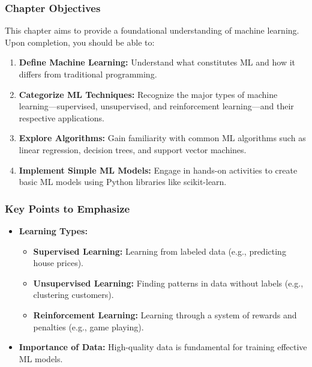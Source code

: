 \documentclass[aspectratio=169]{beamer}
\begin{document}
\begin{frame}[fragile]
    \frametitle{Chapter Objectives}
    This chapter aims to provide a foundational understanding of machine learning. Upon completion, you should be able to:
    \begin{enumerate}
        \item \textbf{Define Machine Learning:} Understand what constitutes ML and how it differs from traditional programming.
        \item \textbf{Categorize ML Techniques:} Recognize the major types of machine learning—supervised, unsupervised, and reinforcement learning—and their respective applications.
        \item \textbf{Explore Algorithms:} Gain familiarity with common ML algorithms such as linear regression, decision trees, and support vector machines.
        \item \textbf{Implement Simple ML Models:} Engage in hands-on activities to create basic ML models using Python libraries like scikit-learn.
    \end{enumerate}
\end{frame}

\begin{frame}[fragile]
    \frametitle{Key Points to Emphasize}
    \begin{itemize}
        \item \textbf{Learning Types:}
        \begin{itemize}
            \item \textbf{Supervised Learning:} Learning from labeled data (e.g., predicting house prices).
            \item \textbf{Unsupervised Learning:} Finding patterns in data without labels (e.g., clustering customers).
            \item \textbf{Reinforcement Learning:} Learning through a system of rewards and penalties (e.g., game playing).
        \end{itemize}
        
        \item \textbf{Importance of Data:} High-quality data is fundamental for training effective ML models.
    \end{itemize}
\end{frame}
\end{document}
